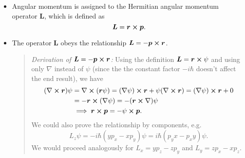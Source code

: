 \documentclass[11pt, a4paper]{article}
\renewcommand{\curl}{\nabla \cross}
\renewcommand{\grad}{\nabla}
\newcommand{\Herm}{Hermitian\xspace}
\renewcommand{\vec}[1]{\bm{#1}}  %
\renewcommand{\r}{\vec{r}}  %
\renewcommand{\L}{\vec{L}}  %
\newcommand{\p}{\psi}  %
\begin{document}
\begin{itemize}
	\item Angular momentum is assigned to the \Herm angular momentum operator $ \vec{L} $, which is defined as
    \begin{equation*}
        \L = \r \cross \vec{p}.
    \end{equation*}
    
    \item The operator $ \vec{L} $ obeys the relationship $ \L = - \vec{p} \cross \r $.
    \begin{quote}
        \textit{Derivation of $ \L = - \vec{p} \cross \r $:} Using the definition $ \L = \r \cross \p $ and using only $ \grad $ instead of $ \p $ (since the the constant factor $ - i \hbar $ doesn't affect the end result), we have
        \begin{align*}
            (\curl \r)\p &= \curl (\r \p) = (\grad \p) \cross \r + \p (\curl \r) = (\grad \p)\cross \r + 0\\
            & = - \r \cross (\grad \p) = - (\r \cross \grad)\p\\
            & \implies \r \cross \vec{p} = - \p \cross \vec{p}.
        \end{align*}
        We could also prove the relationship by components, e.g.
        \begin{equation*}
            L_{z}\p = - i\hbar(y p_{x} - xp_{y}) \p = i\hbar(p_{y}x - p_{x}y)\p.
        \end{equation*}
        We would proceed analogously for $ L_{x} = yp_{z} - zp_{y} $ and $ L_{y} = zp_{x} - x p_{z} $. 
    \end{quote}
	


\end{itemize}
\end{document}
